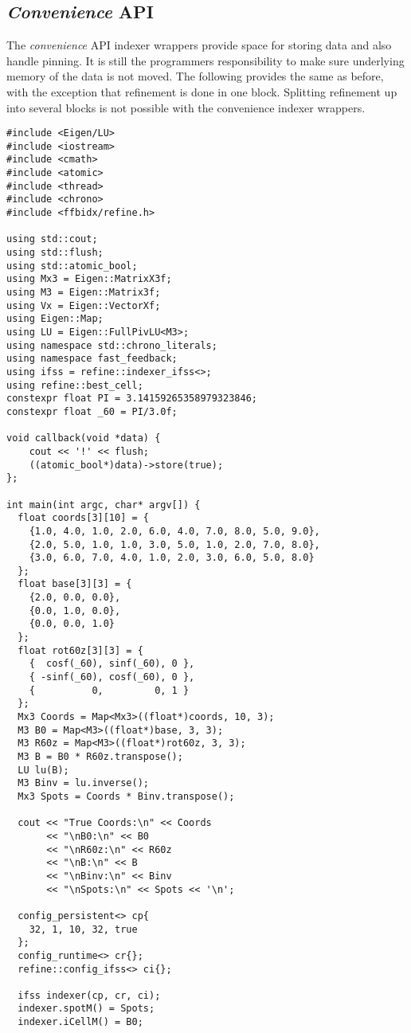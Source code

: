 \documentclass[a4paper,10pt]{article}
\begin{document}
\subsection{\emph{Convenience} API}

The \emph{convenience} API indexer wrappers provide space for storing data and also handle pinning. It is still the programmers responsibility to make sure underlying memory of the data is not moved. The following provides the same as before, with the exception that refinement is done in one block. Splitting refinement up into several blocks is not possible with the convenience indexer wrappers.
%
\begin{lstlisting}
#include <Eigen/LU>
#include <iostream>
#include <cmath>
#include <atomic>
#include <thread>
#include <chrono>
#include <ffbidx/refine.h>

using std::cout;
using std::flush;
using std::atomic_bool;
using Mx3 = Eigen::MatrixX3f;
using M3 = Eigen::Matrix3f;
using Vx = Eigen::VectorXf;
using Eigen::Map;
using LU = Eigen::FullPivLU<M3>;
using namespace std::chrono_literals;
using namespace fast_feedback;
using ifss = refine::indexer_ifss<>;
using refine::best_cell;
constexpr float PI = 3.14159265358979323846;
constexpr float _60 = PI/3.0f;

void callback(void *data) {
    cout << '!' << flush;
    ((atomic_bool*)data)->store(true);
};

int main(int argc, char* argv[]) {
  float coords[3][10] = {
    {1.0, 4.0, 1.0, 2.0, 6.0, 4.0, 7.0, 8.0, 5.0, 9.0},
    {2.0, 5.0, 1.0, 1.0, 3.0, 5.0, 1.0, 2.0, 7.0, 8.0},
    {3.0, 6.0, 7.0, 4.0, 1.0, 2.0, 3.0, 6.0, 5.0, 8.0}
  };
  float base[3][3] = {
    {2.0, 0.0, 0.0},
    {0.0, 1.0, 0.0},
    {0.0, 0.0, 1.0}
  };
  float rot60z[3][3] = {
    {  cosf(_60), sinf(_60), 0 },
    { -sinf(_60), cosf(_60), 0 },
    {          0,         0, 1 }
  };
  Mx3 Coords = Map<Mx3>((float*)coords, 10, 3);
  M3 B0 = Map<M3>((float*)base, 3, 3);
  M3 R60z = Map<M3>((float*)rot60z, 3, 3);
  M3 B = B0 * R60z.transpose();
  LU lu(B);
  M3 Binv = lu.inverse();
  Mx3 Spots = Coords * Binv.transpose();

  cout << "True Coords:\n" << Coords
       << "\nB0:\n" << B0
       << "\nR60z:\n" << R60z
       << "\nB:\n" << B
       << "\nBinv:\n" << Binv
       << "\nSpots:\n" << Spots << '\n';

  config_persistent<> cp{
    32, 1, 10, 32, true
  };
  config_runtime<> cr{};
  refine::config_ifss<> ci{};

  ifss indexer(cp, cr, ci);
  indexer.spotM() = Spots;
  indexer.iCellM() = B0;


\end{lstlisting}
\end{document}
